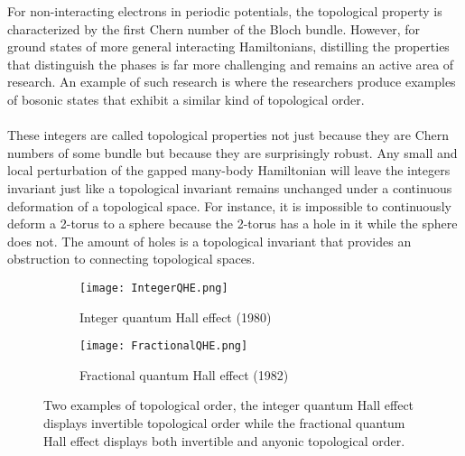 For non-interacting electrons in periodic potentials, the topological property is characterized by the first Chern number of the Bloch bundle. However, for ground states of more general interacting Hamiltonians, distilling the properties that distinguish the phases is far more challenging and remains an active area of research. An example of such research is \cite{sopenko2023chiral} where the researchers produce examples of bosonic states that exhibit a similar kind of topological order.
\\\\
These integers are called topological properties not just because they are Chern numbers of some bundle but because they are surprisingly robust. Any small and local perturbation of the gapped many-body Hamiltonian will leave the integers invariant just like a topological invariant remains unchanged under a continuous deformation of a topological space. For instance, it is impossible to continuously deform a 2-torus to a sphere because the 2-torus has a hole in it while the sphere does not. The amount of holes is a topological invariant that provides an obstruction to connecting topological spaces.
\begin{figure}
	\centering
	\begin{subfigure}[b]{0.45\textwidth}
		\centering
		\texttt{[image: IntegerQHE.png]}
		\caption{Integer quantum Hall effect (1980)}
	\end{subfigure}
	\hfill
	\begin{subfigure}[b]{0.45\textwidth}
		\centering
		\texttt{[image: FractionalQHE.png]}
		\caption{Fractional quantum Hall effect (1982)}
	\end{subfigure}
	\caption{Two examples of topological order, the integer quantum Hall effect displays invertible topological order while the fractional quantum Hall effect displays both invertible and anyonic topological order.}
	\label{fig:TopologicalOrderFigures}
\end{figure}
